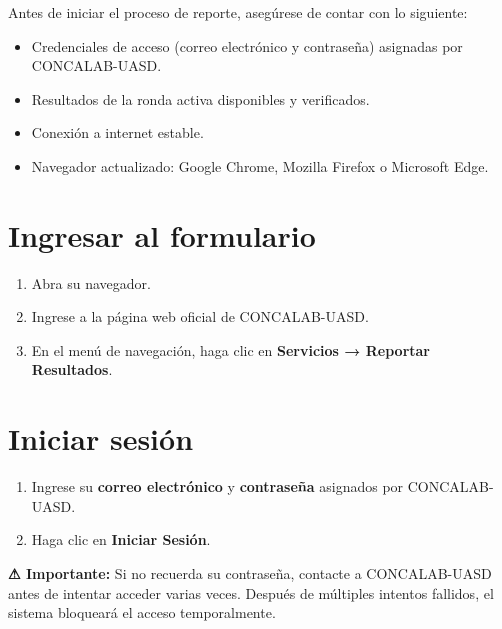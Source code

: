 \documentclass[12pt, letterpaper]{article}
\begin{document}
Antes de iniciar el proceso de reporte, asegúrese de contar con lo siguiente:

\begin{itemize}[leftmargin=1.5em]
  \item Credenciales de acceso (correo electrónico y contraseña) asignadas por CONCALAB-UASD.
  \item Resultados de la ronda activa disponibles y verificados.
  \item Conexión a internet estable.
  \item Navegador actualizado: Google Chrome, Mozilla Firefox o Microsoft Edge.
\end{itemize}

\section{Ingresar al formulario}

\begin{enumerate}[leftmargin=1.5em]
  \item Abra su navegador.
  \item Ingrese a la página web oficial de CONCALAB-UASD.
  \item En el menú de navegación, haga clic en \textbf{Servicios → Reportar Resultados}.
\end{enumerate}

\section{Iniciar sesión}

\begin{enumerate}[leftmargin=1.5em]
  \item Ingrese su \textbf{correo electrónico} y \textbf{contraseña} asignados por CONCALAB-UASD.
  \item Haga clic en \textbf{Iniciar Sesión}.
\end{enumerate}

\begin{cajaaviso}
\textbf{⚠ Importante:} Si no recuerda su contraseña, contacte a CONCALAB-UASD antes de intentar acceder varias veces. Después de múltiples intentos fallidos, el sistema bloqueará el acceso temporalmente.
\end{cajaaviso}

\end{document}
